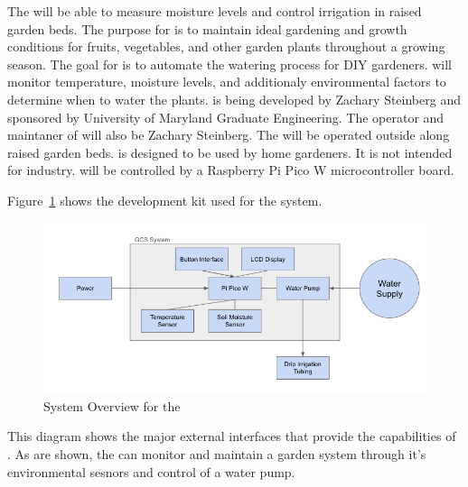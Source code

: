 The \ThisSystem will be able to measure moisture levels and control irrigation in raised garden beds.
The purpose for \ThisSys is to maintain ideal gardening and growth conditions for fruits, vegetables, and other garden plants throughout a growing season.
The goal for \ThisSys is to automate the watering process for DIY gardeners. \ThisSys will monitor temperature, moisture levels, and additionaly environmental factors to determine when to water the plants. 
\ThisSystem is being developed by Zachary Steinberg and sponsored by University of Maryland Graduate Engineering. 
The operator and maintaner of \ThisSys will also be Zachary Steinberg. The \ThisSys will be operated outside along raised garden beds. 
\ThisSys is designed to be used by home gardeners. It is not intended for industry. \ThisSys will be controlled by a Raspberry Pi Pico W microcontroller board.

Figure~\ref{fig:SystemOverview} shows the development kit used for the \ThisSys system. 
\begin{figure}[htbp]
	\centering
		\includegraphics[width=6in]{images/SysOverview.png}
		\caption{System Overview for the \ThisSystem}
	\label{fig:SystemOverview}
\end{figure}
This diagram shows the major external interfaces that provide the capabilities of \ThisSys.
As are shown, the \ThisSys can monitor and maintain a garden system through it's environmental sesnors and control of a water pump.








